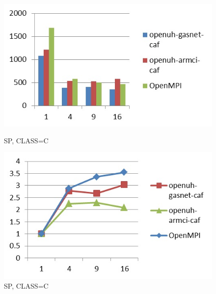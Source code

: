 \begin{figure}[ht]
\begin{minipage}[b]{0.45\linewidth}
\centering
\includegraphics[width=\textwidth]{./figures/sp_C_time.jpg}
\caption{SP, CLASS=C}
\label{fig:figure1}
\end{minipage}
\hspace{0.5cm}
\begin{minipage}[b]{0.45\linewidth}
\centering
\includegraphics[width=\textwidth]{./figures/sp_C_scalability.jpg}
\caption{SP, CLASS=C}
\label{fig:figure2}
\end{minipage}
\end{figure}

